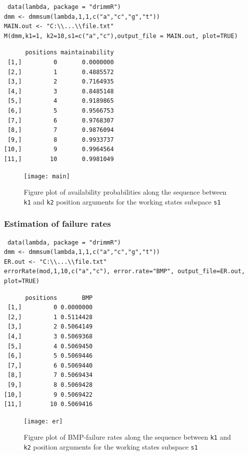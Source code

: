 \documentclass[article,nojss]{jss}\usepackage[]{graphicx}\usepackage[]{color}
\begin{document}
\begin{lstlisting}
 data(lambda, package = "drimmR")
dmm <- dmmsum(lambda,1,1,c("a","c","g","t"))
MAIN.out <- "C:\\...\\file.txt"
M(dmm,k1=1, k2=10,s1=c("a","c"),output_file = MAIN.out, plot=TRUE)
\end{lstlisting}

\begin{lstlisting}
      positions maintainability
 [1,]         0       0.0000000
 [2,]         1       0.4885572
 [3,]         2       0.7164935
 [4,]         3       0.8485148
 [5,]         4       0.9189865
 [6,]         5       0.9566753
 [7,]         6       0.9768307
 [8,]         7       0.9876094
 [9,]         8       0.9933737
[10,]         9       0.9964564
[11,]        10       0.9981049
\end{lstlisting}

\begin{figure}[htbp]
\centering
\texttt{[image: main]}
\caption{Figure plot of availability probabilities along the sequence between {\tt k1} and {\tt k2} position arguments for the working states subspace  {\tt s1} }
\end{figure}



\clearpage

\subsubsection{Estimation of failure rates} \label{subsection_pack_reliab}


\begin{lstlisting}
 data(lambda, package = "drimmR")
dmm <- dmmsum(lambda,1,1,c("a","c","g","t"))
ER.out <- "C:\\...\\file.txt"
errorRate(mod,1,10,c("a","c"), error.rate="BMP", output_file=ER.out, plot=TRUE)
\end{lstlisting}

\begin{lstlisting}
      positions       BMP
 [1,]         0 0.0000000
 [2,]         1 0.5114428
 [3,]         2 0.5064149
 [4,]         3 0.5069368
 [5,]         4 0.5069450
 [6,]         5 0.5069446
 [7,]         6 0.5069440
 [8,]         7 0.5069434
 [9,]         8 0.5069428
[10,]         9 0.5069422
[11,]        10 0.5069416
\end{lstlisting}


\begin{figure}[htbp]
\centering
\texttt{[image: er]}
\caption{Figure plot of BMP-failure rates along the sequence between {\tt k1} and {\tt k2} position arguments for the working states subspace  {\tt s1} }
\end{figure}
\end{document}

